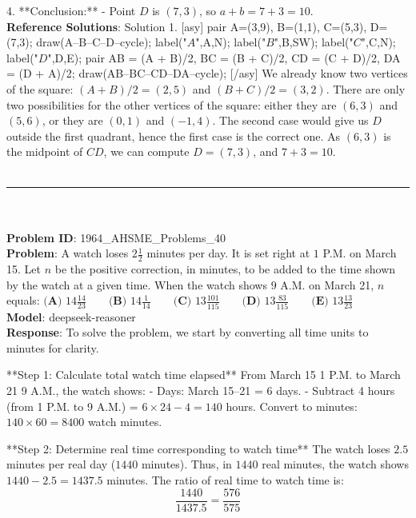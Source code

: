 {4. **Conclusion:**
   - Point \( D \) is \( (7, 3) \), so \( a + b = 7 + 3 = \boxed{10} \). \\
    \textbf{Reference Solutions}: Solution 1. [asy] pair A=(3,9), B=(1,1), C=(5,3), D=(7,3); draw(A--B--C--D--cycle); label("$A$",A,N); label("$B$",B,SW); label("$C$",C,N); label("$D$",D,E); pair AB = (A + B)/2, BC = (B + C)/2, CD = (C + D)/2, DA = (D + A)/2; draw(AB--BC--CD--DA--cycle); [/asy]
We already know two vertices of the square: $(A+B)/2 = (2,5)$ and $(B+C)/2 = (3,2)$. 
There are only two possibilities for the other vertices of the square: either they are $(6,3)$ and $(5,6)$, or they are $(0,1)$ and $(-1,4)$. The second case would give us $D$ outside the first quadrant, hence the first case is the correct one. As $(6,3)$ is the midpoint of $CD$, we can compute $D=(7,3)$, and $7+3=\boxed{10}$. \\
    \vspace{0.3cm} \\
    \hrule \\
    \vspace{0.5cm} \\
    \textbf{Problem ID}: 1964_AHSME_Problems_40 \\
    \textbf{Problem}: A watch loses $2\frac{1}{2}$ minutes per day. It is set right at $1$ P.M. on March 15. Let $n$ be the positive correction, in minutes, to be added to the time shown by the watch at a given time. When the watch shows $9$ A.M. on March 21, $n$ equals:
$\textbf{(A) }14\frac{14}{23}\qquad\textbf{(B) }14\frac{1}{14}\qquad\textbf{(C) }13\frac{101}{115}\qquad\textbf{(D) }13\frac{83}{115}\qquad \textbf{(E) }13\frac{13}{23}$ \\
    \textbf{Model}: deepseek-reasoner \\
    \textbf{Response}: To solve the problem, we start by converting all time units to minutes for clarity.

**Step 1: Calculate total watch time elapsed**  
From March 15 1 P.M. to March 21 9 A.M., the watch shows:  
- Days: March 15–21 = 6 days.  
- Subtract 4 hours (from 1 P.M. to 9 A.M.) = \(6 \times 24 - 4 = 140\) hours.  
Convert to minutes: \(140 \times 60 = 8400\) watch minutes.

**Step 2: Determine real time corresponding to watch time**  
The watch loses \(2.5\) minutes per real day (\(1440\) minutes). Thus, in \(1440\) real minutes, the watch shows \(1440 - 2.5 = 1437.5\) minutes. The ratio of real time to watch time is:  
\[
\frac{1440}{1437.5} = \frac{576}{575}
\]

}
